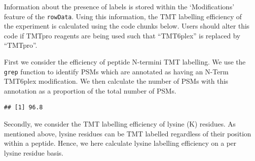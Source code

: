 \documentclass[9pt,a4paper,]{extarticle}
\newenvironment{Shaded}{\begin{snugshade}}{\end{snugshade}}
\newcommand{\AttributeTok}[1]{\textcolor[rgb]{0.13,0.29,0.53}{#1}}
\newcommand{\DecValTok}[1]{\textcolor[rgb]{0.00,0.00,0.81}{#1}}
\newcommand{\DocumentationTok}[1]{\textcolor[rgb]{0.56,0.35,0.01}{\textbf{\textit{#1}}}}
\newcommand{\FunctionTok}[1]{\textcolor[rgb]{0.13,0.29,0.53}{\textbf{#1}}}
\newcommand{\NormalTok}[1]{#1}
\newcommand{\OtherTok}[1]{\textcolor[rgb]{0.56,0.35,0.01}{#1}}
\newcommand{\SpecialCharTok}[1]{\textcolor[rgb]{0.81,0.36,0.00}{\textbf{#1}}}
\newcommand{\StringTok}[1]{\textcolor[rgb]{0.31,0.60,0.02}{#1}}
\begin{document}
Information about the presence of labels is stored within the `Modifications'
feature of the \texttt{rowData}. Using this information, the TMT labelling efficiency
of the experiment is calculated using the code chunks below. Users should alter
this code if TMTpro reagents are being used such that ``TMT6plex'' is replaced by
``TMTpro''.

First we consider the efficiency of peptide N-termini TMT labelling. We use the
\texttt{grep} function to identify PSMs which are annotated as having an N-Term TMT6plex
modification. We then calculate the number of PSMs with this annotation as a
proportion of the total number of PSMs.

\begin{Shaded}
\end{Shaded}

\begin{verbatim}
## [1] 96.8
\end{verbatim}

Secondly, we consider the TMT labelling efficiency of lysine (K) residues. As
mentioned above, lysine residues can be TMT labelled regardless of their
position within a peptide. Hence, we here calculate lysine labelling efficiency
on a per lysine residue basis.
\end{document}
